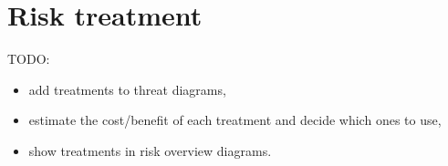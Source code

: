 \section{Risk treatment}

TODO:
\begin{itemize}
  \item add treatments to threat diagrams,
  \item estimate the cost/benefit of each treatment and decide
    which ones to use,
  \item show treatments in risk overview diagrams.
\end{itemize}
